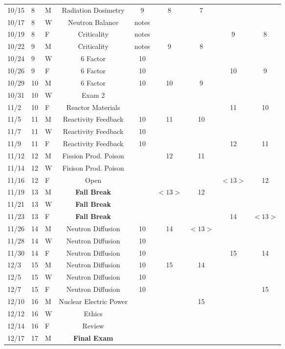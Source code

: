 \documentclass[11pt, a4paper]{article}
\begin{document}
\begin{table}[h]
\begin{center}
\begin{tabular}{lllcccccc}
10/15 & 8 & M & Radiation Dosimetry  & 9 &  8 & 7 &  &  \\
10/17 & 8 & W & Neutron Balance  & notes &  &  &  &  \\
10/19 & 8 & F & Criticality  & notes &  &  & 9 & 8 \\
10/22 & 9 & M & Criticality  & notes & 9 & 8 &  &  \\
10/24 & 9 & W & 6 Factor  & 10 &  &  &  &  \\
10/26 & 9 & F & 6 Factor  & 10 &  &  & 10 & 9 \\
10/29 & 10 & M & 6 Factor  & 10 & 10 & 9 &  & \\
10/31 & 10 & W & Exam 2  &  &  &  &  &  \\
11/2 & 10 & F & Reactor Materials   &     &    &    &  11  & 10  \\
11/5 & 11 & M & Reactivity Feedback & 10  & 11 & 10 &  &  \\
11/7 & 11 & W & Reactivity Feedback  & 10 &  &  &  &  \\
11/9 & 11 & F & Reactivity Feedback  & 10 &  &  & 12 & 11 \\
11/12 & 12 & M & Fission Prod. Poison &  & 12 & 11 &  &  \\
11/14 & 12 & W & Fisison Prod. Poison  &  &  &  &  &  \\
11/16 & 12 & F & Open &  &  &  &  $<13>$ & 12 \\
11/19 & 13 & M & \textbf{Fall Break}& & $<13>$ & 12 &  &  \\
11/21 & 13 & W & \textbf{Fall Break}  &  &  &  &  &  \\
11/23 & 13 & F & \textbf{Fall Break}  &  &  &  & 14 & $<13>$ \\
11/26 & 14 & M & Neutron Diffusion& 10 &14& $<13>$ &  & \\
11/28 & 14 & W & Neutron Diffusion  & 10 &  &  &  &  \\
11/30 & 14 & F & Neutron Diffusion  & 10  &  &  & 15 & 14 \\
12/3 & 15 & M & Neutron Diffusion & 10 & 15 & 14 &  &  \\
12/5 & 15 & W & Neutron Diffusion  &  10 &  &  &  &  \\
12/7 & 15 & F & Neutron Diffusion  & 10 &  &  &  & 15 \\
12/10 & 16 & M &  Nuclear Electric Power&  &  & 15 &  &  \\
12/12 & 16 & W &  Ethics &  &  &  &  &  \\
12/14 & 16 & F & Review  &  &  &  &  &  \\
12/17 & 17 & M & \textbf{Final Exam} &   &  &  &  &  \\
\end{tabular}
\end{center}
\end{table}
\FloatBarrier



\end{document}
